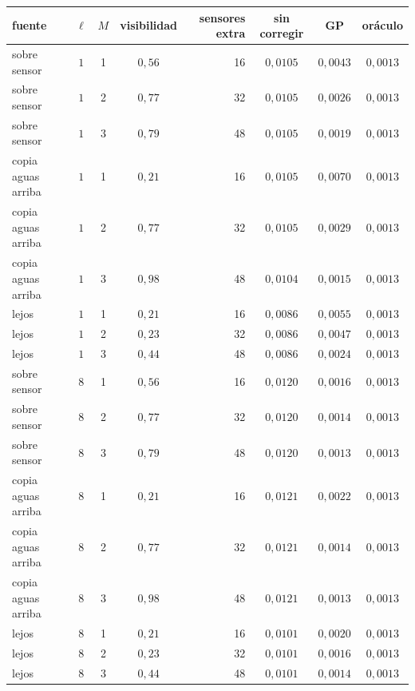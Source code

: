 \begin{tabular}{lcccrccc}
\toprule
fuente & $\ell$ & $M$ & visibilidad & sensores extra & sin corregir & GP & oráculo \\
\midrule
sobre sensor & $1$ & 1 & $0{,}56$ & 16 & $0{,}0105$ & $0{,}0043$ & $0{,}0013$ \\
sobre sensor & $1$ & 2 & $0{,}77$ & 32 & $0{,}0105$ & $0{,}0026$ & $0{,}0013$ \\
sobre sensor & $1$ & 3 & $0{,}79$ & 48 & $0{,}0105$ & $0{,}0019$ & $0{,}0013$ \\
copia aguas arriba & $1$ & 1 & $0{,}21$ & 16 & $0{,}0105$ & $0{,}0070$ & $0{,}0013$ \\
copia aguas arriba & $1$ & 2 & $0{,}77$ & 32 & $0{,}0105$ & $0{,}0029$ & $0{,}0013$ \\
copia aguas arriba & $1$ & 3 & $0{,}98$ & 48 & $0{,}0104$ & $0{,}0015$ & $0{,}0013$ \\
lejos & $1$ & 1 & $0{,}21$ & 16 & $0{,}0086$ & $0{,}0055$ & $0{,}0013$ \\
lejos & $1$ & 2 & $0{,}23$ & 32 & $0{,}0086$ & $0{,}0047$ & $0{,}0013$ \\
lejos & $1$ & 3 & $0{,}44$ & 48 & $0{,}0086$ & $0{,}0024$ & $0{,}0013$ \\
sobre sensor & $8$ & 1 & $0{,}56$ & 16 & $0{,}0120$ & $0{,}0016$ & $0{,}0013$ \\
sobre sensor & $8$ & 2 & $0{,}77$ & 32 & $0{,}0120$ & $0{,}0014$ & $0{,}0013$ \\
sobre sensor & $8$ & 3 & $0{,}79$ & 48 & $0{,}0120$ & $0{,}0013$ & $0{,}0013$ \\
copia aguas arriba & $8$ & 1 & $0{,}21$ & 16 & $0{,}0121$ & $0{,}0022$ & $0{,}0013$ \\
copia aguas arriba & $8$ & 2 & $0{,}77$ & 32 & $0{,}0121$ & $0{,}0014$ & $0{,}0013$ \\
copia aguas arriba & $8$ & 3 & $0{,}98$ & 48 & $0{,}0121$ & $0{,}0013$ & $0{,}0013$ \\
lejos & $8$ & 1 & $0{,}21$ & 16 & $0{,}0101$ & $0{,}0020$ & $0{,}0013$ \\
lejos & $8$ & 2 & $0{,}23$ & 32 & $0{,}0101$ & $0{,}0016$ & $0{,}0013$ \\
lejos & $8$ & 3 & $0{,}44$ & 48 & $0{,}0101$ & $0{,}0014$ & $0{,}0013$ \\
\bottomrule
\end{tabular}
